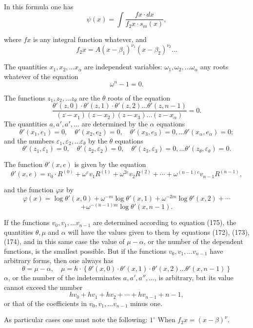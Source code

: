 \documentclass{article}
\begin{document}
In this formula one has
\[ \psi(x) = \int \frac{f x \cdot dx}{f_2 x \cdot s_m(x)}, \tag{180} \]

where $f x$ is any integral function whatever, and
\[ f_2 x = A(x-\beta_1)^{\nu_1}(x-\beta_2)^{\nu_2} \ldots \]

The quantities $x_1, x_2, \ldots x_\alpha$ are independent variables: $\omega_1, \omega_2, \ldots \omega_\alpha$ any roots whatever of the equation
\[ \omega^{n} - 1 = 0. \]

The functions $z_1, z_2, \ldots z_\theta$ are the $\theta$ roots of the equation
\[ \frac{\theta'(z,0) \cdot \theta'(z,1) \cdot \theta'(z,2) \ldots \theta'(z,n-1)}{(z-x_1)(z-x_2)(z-x_3) \ldots (z-x_\alpha)} = 0. \tag{181} \]
The quantities $a, a', a', \ldots$ are determined by the $\alpha$ equations
\[ \theta'(x_1,e_1) = 0, \quad \theta'(x_2,e_2) = 0, \quad \theta'(x_3,e_3) = 0, \ldots \theta'(x_\alpha,e_\alpha) = 0; \tag{182} \]
and the numbers $\varepsilon_1, \varepsilon_2, \ldots \varepsilon_\theta$ by the $\theta$ equations
\[ \theta'(z_1,\varepsilon_1) = 0, \quad \theta'(z_2,\varepsilon_2) = 0, \quad \theta'(z_3,\varepsilon_3) = 0, \ldots \theta'(z_\theta,\varepsilon_\theta) = 0. \tag{183} \]

The function $\theta'(x,e)$ is given by the equation
\[ \theta'(x,e) = v_0 \cdot R^{(0)}+\omega^{e}v_1 R^{(1)}+\omega^{2e}v_2 R^{(2)}+\cdots+\omega^{(n-1)e}v_{n-1}R^{(n-1)}, \tag{184} \]

and the function $\varphi x$ by
\[ \varphi(x) = \log\theta'(x,0)+\omega^{-m}\log\theta'(x,1)+\omega^{-2m}\log\theta'(x,2)+\cdots \]
\[ +\omega^{-(n-1)m}\log\theta'(x,n-1). \tag{185} \]

If the functions $v_0, v_1, \ldots v_{n-1}$ are determined according to equation (175), the quantities $\theta, \mu$ and $\alpha$ will have the values given to them by equations (172), (173), (174), and in this same case the value of $\mu-\alpha$, or the number of the dependent functions, is the smallest possible. But if the functions $v_0, v_1, \ldots v_{n-1}$ have arbitrary forms, then one always has
\[ \theta = \mu-\alpha, \quad \mu = h \cdot \left\{\theta'(x,0) \cdot \theta'(x,1) \cdot \theta'(x,2) \ldots \theta'(x,n-1)\right\} \tag{186} \]
$\alpha$, or the number of the indeterminates $a, a', a'', \ldots$, is arbitrary, but its value cannot exceed the number
\[ hv_0+hv_1+hv_2+\cdots+hv_{n-1}+n-1, \]
or that of the coefficients in $v_0, v_1, \ldots v_{n-1}$ minus one.

As particular cases one must note the following:
$1^\circ$ When $f_2 x = (x-\beta)^{\nu}$.
\end{document}
